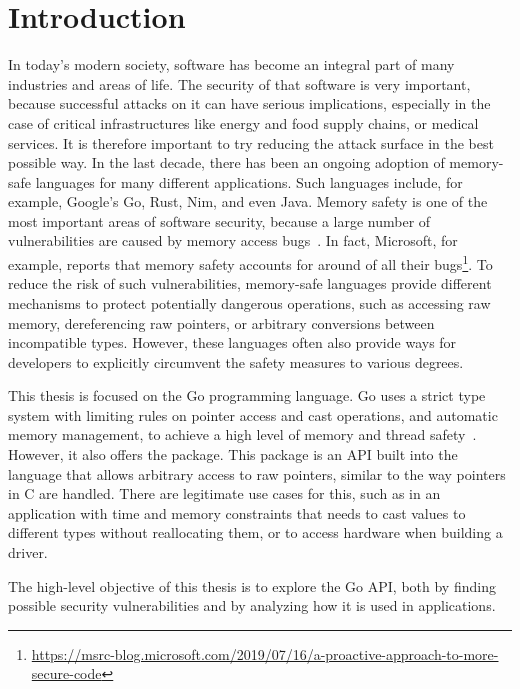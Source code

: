 
\chapter{Introduction}\label{ch:introduction}

In today's modern society, software has become an integral part of many industries and areas of life.
The security of that software is very important, because successful attacks on it can have serious implications,
especially in the case of critical infrastructures like energy and food supply chains, or medical services.
It is therefore important to try reducing the attack surface in the best possible way.
In the last decade, there has been an ongoing adoption of memory-safe languages for many different applications.
Such languages include, for example, Google's Go, Rust, Nim, and even Java.
Memory safety is one of the most important areas of software security, because a large number of vulnerabilities are
caused by memory access bugs~\cite{heffley2004}.
In fact, Microsoft, for example, reports that memory safety accounts for around  of all their
bugs\footnote{\scriptsize\url{https://msrc-blog.microsoft.com/2019/07/16/a-proactive-approach-to-more-secure-code}}.
To reduce the risk of such vulnerabilities, memory-safe languages provide different mechanisms to protect potentially
dangerous operations, such as accessing raw memory, dereferencing raw pointers, or arbitrary conversions between
incompatible types.
However, these languages often also provide ways for developers to explicitly circumvent the safety measures to various
degrees.

This thesis is focused on the Go programming language.
Go uses a strict type system with limiting rules on pointer access and cast operations, and automatic memory
management, to achieve a high level of memory and thread safety~\cite{sibiryov2017}.
However, it also offers the \unsafe{} package.
This package is an \acrshort{API} built into the language that allows arbitrary access to raw pointers, similar to the
way pointers in C are handled.
There are legitimate use cases for this, such as in an application with time and memory constraints that needs to cast
values to different types without reallocating them, or to access hardware when building a driver.

\begin{hero}
    The high-level objective of this thesis is to explore the Go \unsafe{} \acrshort{API}, both by finding possible
    security vulnerabilities and by analyzing how it is used in applications.
\end{hero}

